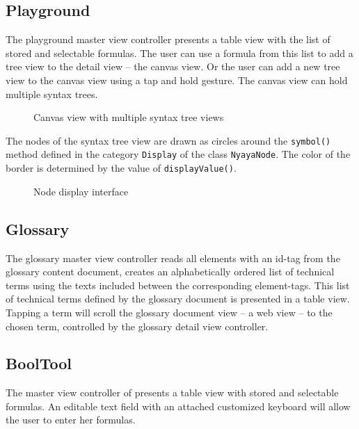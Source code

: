 \subsection{Playground}

The playground master view controller presents a table view with the list of stored and selectable formulas.
The user can use a formula from this list to add a tree view to the detail view – the canvas view.
Or the user can add a new tree view to the canvas view using a tap and hold gesture.
The canvas view can hold multiple syntax trees.

\begin{figure}[htbp]
\begin{center}
\caption{Canvas view with multiple syntax tree views}
\label{fig:TreeView}
\end{center}
\end{figure}

The nodes of the syntax tree view are drawn as circles around the \verb+symbol()+ 
method defined in the category
\verb+Display+ of the class \verb+NyayaNode+.
The color of the border is determined by the value of \verb+displayValue()+.


\begin{figure}[htbp]
\begin{center}
\caption{Node display interface}
\label{fig:NyayaNodeDisplay}
\end{center}
\end{figure}

\subsection{Glossary}

The glossary master view controller reads all elements with an id-tag from the glossary content document,
creates an alphabetically ordered list of technical terms using the texts included between the corresponding element-tags.
This list of technical terms defined by the glossary document is presented in a table view.
Tapping a term will scroll the glossary document view – a web view – to the chosen term, 
controlled by the glossary detail view controller.

\subsection{BoolTool}

The master view controller of \BoolTool presents a table view with stored and selectable formulas.
An editable text field with an attached customized keyboard will allow the user to enter her formulas.

